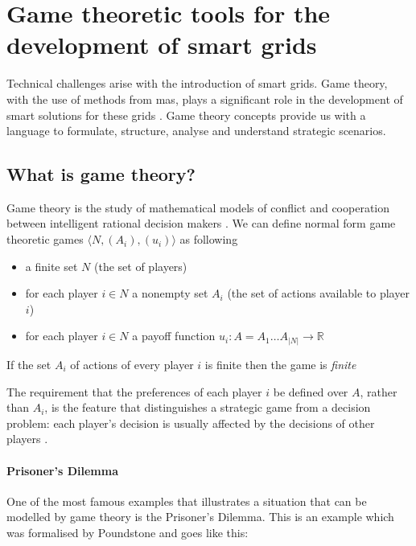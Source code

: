 \section{Game theoretic tools for the development of smart grids} \label{gametheory}
\acresetall
Technical challenges arise with the introduction of smart grids. Game theory, with the use of methods from \ac{mas}, plays a significant role in the development of smart solutions for these grids \cite{keypaper}. Game theory concepts provide us with a language to formulate, structure, analyse and understand strategic scenarios.

\subsection{What is game theory?}
Game theory is the study of mathematical models of conflict and cooperation between intelligent rational decision makers \cite{myerson2013game}.
We can define normal form game theoretic games $\langle N, (A_i), (u_i) \rangle$ as following
\begin{itemize}
    \item a finite set $N$ (the set of players)
    \item for each player $i \in N$ a nonempty set $A_i$ (the set of actions available to player $i$)
    \item for each player $i \in N$ a payoff function $u_i: A = A_1 \ldots A_{|N|} \rightarrow \mathbb{R}$
\end{itemize}

If the set $A_i$ of actions of every player $i$ is finite then the game is \emph{finite}

The requirement that the preferences of each player $i$ be defined over $A$, rather than $A_{i}$, is the feature that distinguishes a strategic game from a decision problem: each player's decision is usually affected by the decisions of other players \cite{CourseInGameTheory}.

\paragraph{Prisoner's Dilemma}
One of the most famous examples that illustrates a situation that can be modelled by game theory is the Prisoner's Dilemma. This is an example which was formalised by Poundstone \cite{poundstone} and goes like this: 

